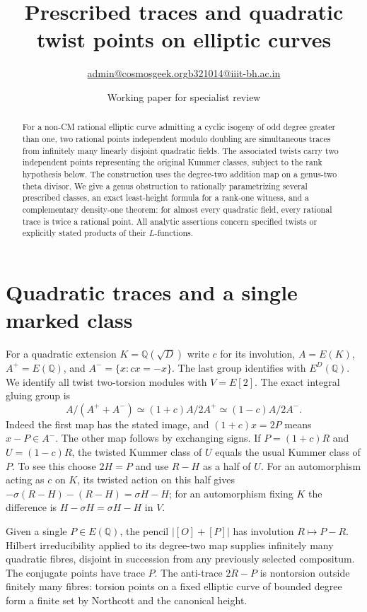 \documentclass[11pt]{article}
\title{Prescribed traces and quadratic twist points on elliptic curves}
\author{\small \href{mailto:admin@cosmosgeek.org}{admin@cosmosgeek.org}\qquad \href{mailto:b321014@iiit-bh.ac.in}{b321014@iiit-bh.ac.in}}\date{Working paper for specialist review}
\newcommand{\Q}{\mathbb Q}\newcommand{\F}{\mathbb F}\newcommand{\Z}{\mathbb Z}
\begin{document}
\maketitle
\begin{abstract}
For a non-CM rational elliptic curve admitting a cyclic isogeny of odd degree greater than one, two rational points independent modulo doubling are simultaneous traces from infinitely many linearly disjoint quadratic fields. The associated twists carry two independent points representing the original Kummer classes, subject to the rank hypothesis below. The construction uses the degree-two addition map on a genus-two theta divisor. We give a genus obstruction to rationally parametrizing several prescribed classes, an exact least-height formula for a rank-one witness, and a complementary density-one theorem: for almost every quadratic field, every rational trace is twice a rational point. All analytic assertions concern specified twists or explicitly stated products of their $L$-functions.
\end{abstract}

\section{Quadratic traces and a single marked class}
For a quadratic extension $K=\Q(\sqrt D)$ write $c$ for its involution, $A=E(K)$, $A^+=E(\Q)$, and $A^-=\{x:cx=-x\}$. The last group identifies with $E^D(\Q)$. We identify all twist two-torsion modules with $V=E[2]$.
The exact integral gluing group is
\begin{equation}\label{glue}
 A/(A^++A^-)\simeq (1+c)A/2A^+\simeq (1-c)A/2A^- .
\end{equation}
Indeed the first map has the stated image, and $(1+c)x=2P$ means $x-P\in A^-$. The other map follows by exchanging signs.
If $P=(1+c)R$ and $U=(1-c)R$, the twisted Kummer class of $U$ equals the usual Kummer class of $P$. To see this choose $2H=P$ and use $R-H$ as a half of $U$. For an automorphism acting as $c$ on $K$, its twisted action on this half gives
$-\sigma(R-H)-(R-H)=\sigma H-H$; for an automorphism fixing $K$ the difference is $H-\sigma H=\sigma H-H$ in $V$.

Given a single $P\in E(\Q)$, the pencil $|[O]+[P]|$ has involution $R\mapsto P-R$. Hilbert irreducibility applied to its degree-two map supplies infinitely many quadratic fibres, disjoint in succession from any previously selected compositum. The conjugate points have trace $P$. The anti-trace $2R-P$ is nontorsion outside finitely many fibres: torsion points on a fixed elliptic curve of bounded degree form a finite set by Northcott and the canonical height.
\end{document}
